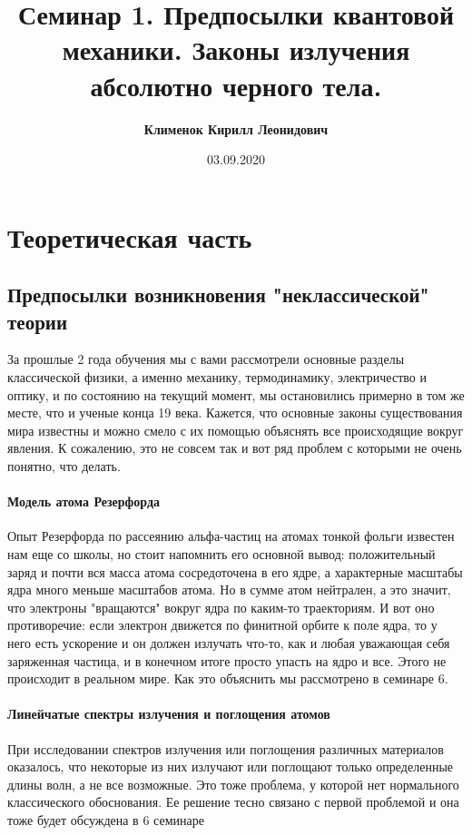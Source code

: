 \documentclass[12pt]{article}
\begin{document}
 
\title{\textbf{Семинар 1. Предпосылки квантовой механики. Законы излучения абсолютно черного тела.}}
\author{\textbf{Клименок Кирилл Леонидович}}
\date{03.09.2020}
\maketitle
\section{Теоретическая часть}
\subsection{Предпосылки возникновения "неклассической" теории}
За прошлые 2 года обучения мы с вами рассмотрели основные разделы классической физики, а именно механику, термодинамику, электричество и оптику, и по состоянию на текущий момент, мы остановились примерно в том же месте, что и ученые конца 19 века. Кажется, что основные законы существования мира известны и можно смело с их помощью объяснять все происходящие вокруг явления. К сожалению, это не совсем так и вот ряд проблем с которыми не очень понятно, что делать.
\paragraph{Модель атома Резерфорда}
Опыт Резерфорда по рассеянию альфа-частиц на атомах тонкой фольги известен нам еще со школы, но стоит напомнить его основной вывод: положительный заряд и почти вся масса атома сосредоточена в его ядре, а характерные масштабы ядра много меньше масштабов атома. Но в сумме атом нейтрален, а это значит, что электроны "вращаются" вокруг ядра по каким-то траекториям. И вот оно противоречие: если электрон движется по финитной орбите к поле ядра, то у него есть ускорение и он должен излучать что-то, как и любая уважающая себя заряженная частица, и в конечном итоге просто упасть на ядро и все. Этого не происходит в реальном мире. Как это объяснить мы рассмотрено в семинаре 6.
\paragraph{Линейчатые спектры излучения и поглощения атомов} 
При исследовании спектров излучения или поглощения различных материалов оказалось, что некоторые из них излучают или поглощают только определенные длины волн, а не все возможные. Это тоже проблема, у которой нет нормального классического обоснования. Ее решение тесно связано с первой проблемой и она тоже будет обсуждена в 6 семинаре
\end{document}
